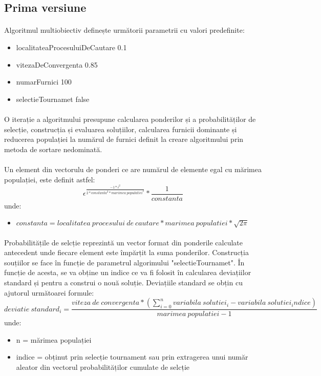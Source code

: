 \subsection{Prima versiune}
\paragraph{}
Algoritmul multiobiectiv definește următorii parametrii cu valori predefinite:
\begin{itemize}
    \item localitateaProcesuluiDeCautare 0.1
    \item vitezaDeConvergenta 0.85
    \item numarFurnici 100
    \item selectieTournamet false
\end{itemize}
\paragraph{}
O iterație a algoritmului presupune calcularea ponderilor și a probabilităților de selecție, construcția și evaluarea soluțiilor, calcularea furnicii dominante și reducerea populației la numărul de furnici definit la creare algoritmului prin metoda de sortare nedominată.
\paragraph{}
Un element din vectorulu de ponderi ce are numărul de elemente egal cu mărimea populației, este definit astfel:
\begin{equation}
    \epsilon^{\frac{-1*i^2}{2*constanta^2*marimea\ populatiei^2}}*\frac{1}{constanta}
\end{equation}
unde:
\begin{itemize}
    \item $constanta = localitatea\ procesului\ de\ cautare * marimea\ populatiei * \sqrt{2\pi}$
\end{itemize}
\paragraph{}
Probabilitățile de selcție reprezintă un vector format din ponderile calculate antecedent unde fiecare element este împărțit la suma ponderilor.
Construcția souțiilor se face în funcție de parametrul algorimului "selectieTournamet". În funcție de acesta, se va obține un indice ce va fi folosit în calcularea deviațiilor standard și pentru a construi o nouă soluție. Deviațiile standard se obțin cu ajutorul următoarei formule:
\begin{equation}
    deviatie\ standard_i = \frac {viteza\ de\ convergenta * (\sum_{i=0}^{n} variabila\ solutiei_i - variabila\ solutiei_indice)} {marimea\ populatiei - 1}
\end{equation}
unde:
\begin{itemize}
    \item n = mărimea populației
    \item indice = obținut prin selecție tournament sau prin extragerea unui număr aleator din vectorul probabilităților cumulate de selcție
\end{itemize}
